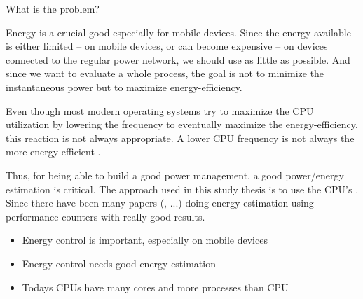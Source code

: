 
What is the problem?

Energy is a crucial good especially for mobile devices. Since the energy
available is either limited -- on mobile devices, or can become expensive --
on devices connected to the regular power network, we should use as little as
possible. And since we want to evaluate a whole process, the goal is not to
minimize the instantaneous power but to maximize energy-efficiency.

Even though most modern operating systems try to maximize the CPU utilization
by lowering the frequency \cite{snowdon2010operating} to eventually maximize the
energy-efficiency, this reaction is not always appropriate. A lower CPU
frequency is not always the more energy-efficient
\cite{weissel2002process,snowdon2010operating}.

Thus, for being able to build a good power management, a good power/energy
estimation is critical. The approach used in this study thesis is to use the
CPU's .  Since \cite{bellosa2000benefits} there
have been many papers
(\cite{Bertran2010,bertran2010decomposable,kellner03tempcontrol,isci2003runtime,
weissel2002process}, ...) doing energy estimation using performance counters
with really good results.


\begin{itemize}

\item Energy control is important, especially on mobile devices

\item Energy control needs good energy estimation

\item Todays CPUs have many cores and more processes than CPU

\end{itemize}

